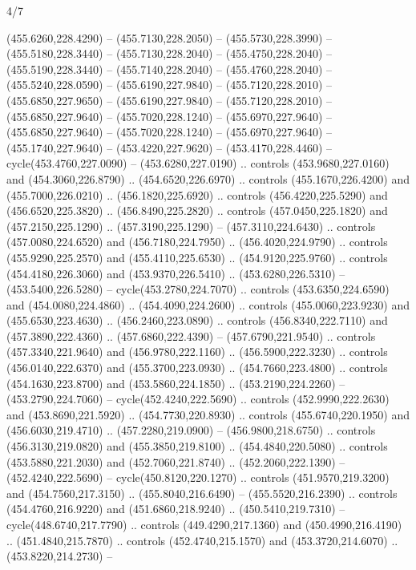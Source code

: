 \begin{flagdescription}{4/7}
\begin{scope}[shift={(0.5\flaglength,0.5\flagwidth)},scale=\flagwidth*\stretchfactor/820]
\begin{scope}[scale=1.87,xshift=-138mm,yshift=75mm]
\begin{scope}[y=0.8pt, x=0.8pt, yscale=-1, xscale=1]
\begin{scope}[fill=c816c2a]
  (455.6260,228.4290) -- (455.7130,228.2050) -- (455.5730,228.3990) --
  (455.5180,228.3440) -- (455.7130,228.2040) -- (455.4750,228.2040) --
  (455.5190,228.3440) -- (455.7140,228.2040) -- (455.4760,228.2040) --
  (455.5240,228.0590) -- (455.6190,227.9840) -- (455.7120,228.2010) --
  (455.6850,227.9650) -- (455.6190,227.9840) -- (455.7120,228.2010) --
  (455.6850,227.9640) -- (455.7020,228.1240) -- (455.6970,227.9640) --
  (455.6850,227.9640) -- (455.7020,228.1240) -- (455.6970,227.9640) --
  (455.1740,227.9640) -- (453.4220,227.9620) -- (453.4170,228.4460) --
  cycle(453.4760,227.0090) -- (453.6280,227.0190) .. controls
  (453.9680,227.0160) and (454.3060,226.8790) .. (454.6520,226.6970) .. controls
  (455.1670,226.4200) and (455.7000,226.0210) .. (456.1820,225.6920) .. controls
  (456.4220,225.5290) and (456.6520,225.3820) .. (456.8490,225.2820) .. controls
  (457.0450,225.1820) and (457.2150,225.1290) .. (457.3190,225.1290) --
  (457.3110,224.6430) .. controls (457.0080,224.6520) and (456.7180,224.7950) ..
  (456.4020,224.9790) .. controls (455.9290,225.2570) and (455.4110,225.6530) ..
  (454.9120,225.9760) .. controls (454.4180,226.3060) and (453.9370,226.5410) ..
  (453.6280,226.5310) -- (453.5400,226.5280) -- cycle(453.2780,224.7070) ..
  controls (453.6350,224.6590) and (454.0080,224.4860) .. (454.4090,224.2600) ..
  controls (455.0060,223.9230) and (455.6530,223.4630) .. (456.2460,223.0890) ..
  controls (456.8340,222.7110) and (457.3890,222.4360) .. (457.6860,222.4390) --
  (457.6790,221.9540) .. controls (457.3340,221.9640) and (456.9780,222.1160) ..
  (456.5900,222.3230) .. controls (456.0140,222.6370) and (455.3700,223.0930) ..
  (454.7660,223.4800) .. controls (454.1630,223.8700) and (453.5860,224.1850) ..
  (453.2190,224.2260) -- (453.2790,224.7060) -- cycle(452.4240,222.5690) ..
  controls (452.9990,222.2630) and (453.8690,221.5920) .. (454.7730,220.8930) ..
  controls (455.6740,220.1950) and (456.6030,219.4710) .. (457.2280,219.0900) --
  (456.9800,218.6750) .. controls (456.3130,219.0820) and (455.3850,219.8100) ..
  (454.4840,220.5080) .. controls (453.5880,221.2030) and (452.7060,221.8740) ..
  (452.2060,222.1390) -- (452.4240,222.5690) -- cycle(450.8120,220.1270) ..
  controls (451.9570,219.3200) and (454.7560,217.3150) .. (455.8040,216.6490) --
  (455.5520,216.2390) .. controls (454.4760,216.9220) and (451.6860,218.9240) ..
  (450.5410,219.7310) -- cycle(448.6740,217.7790) .. controls
  (449.4290,217.1360) and (450.4990,216.4190) .. (451.4840,215.7870) .. controls
  (452.4740,215.1570) and (453.3720,214.6070) .. (453.8220,214.2730) --

\end{scope}
\end{scope}
\end{scope}
\end{scope}
\end{flagdescription}
